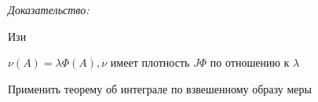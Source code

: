 \documentclass[paper=a4, fontsize=17pt]{article}
\begin{document}
\emph{Доказательство:}

Изи

$\nu(A) = \lambda \Phi (A), \nu$ имеет плотность $J \Phi$ по отношению к $\lambda$

Применить теорему об интеграле по взвешенному образу меры


\end{document}
